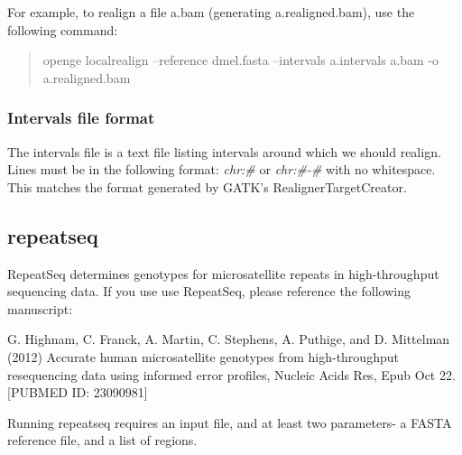 \documentclass[11pt]{article}
\newcommand {\cmd}[1] {\begin{quote}#1\end{quote}}
\begin{document}
For example, to realign a file a.bam (generating a.realigned.bam), use the following command:
\cmd{openge localrealign --reference dmel.fasta --intervals a.intervals a.bam -o a.realigned.bam}

\subsubsection {Intervals file format}
The intervals file is a text file listing intervals around which we should realign. Lines must be in the following format:
\textit{chr:\#} or \textit{chr:\#-\#} with no whitespace. This matches the format generated by GATK's RealignerTargetCreator.

\subsection{repeatseq}
RepeatSeq determines genotypes for microsatellite repeats in high-throughput sequencing data. If you use use RepeatSeq, please reference the following manuscript:

G. Highnam, C. Franck, A. Martin, C. Stephens, A. Puthige, and D. Mittelman (2012) Accurate human microsatellite genotypes from high-throughput resequencing data using informed error profiles, Nucleic Acids Res, Epub Oct 22.  [PUBMED ID: 23090981]

Running repeatseq requires an input file, and at least two parameters- a FASTA reference file, and a list of regions.
\end{document}
